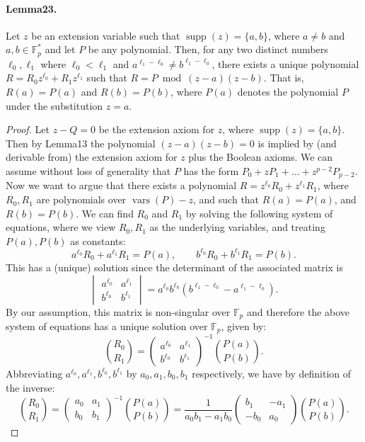 \documentclass[10pt,a4paper]{article}
\DeclareMathOperator{\supp}{supp}
\DeclareMathOperator{\vars}{vars}
\begin{document}
\paragraph{Lemma23.} Let $z$ be an extension variable such that $\supp(z)=\{a,b\}$, where $a\neq b$ and $a,b\in\mathbb F_p^*$ and let $P$ be any polynomial. Then, for any two distinct numbers $\ell_0,\ell_1$ where $\ell_0<\ell_1$ and $a^{\ell_1-\ell_0}\neq b^{\ell_1-\ell_0}$, there exists a unique polynomial $R=R_0z^{\ell_0}+R_1z^{\ell_1}$ such that $R=P\bmod(z-a)(z-b)$. That is, $R(a)=P(a)$ and $R(b)=P(b)$, where $P(a)$ denotes the polynomial $P$ under the substitution $z=a$.
\begin{proof}
Let $z-Q=0$ be the extension axiom for $z$, where $\supp(z)=\{a,b\}$. Then by Lemma13 the polynomial $(z-a)(z-b)=0$ is implied by (and derivable from) the extension axiom for $z$ plus the Boolean axioms. We can assume without loss of generality that $P$ has the form $P_0+zP_1+\ldots+z^{p-2}P_{p-2}$.
Now we want to argue that there exists a polynomial $R=z^{\ell_0}R_0+z^{\ell_1}R_1$, where $R_0,R_1$ are polynomials over $\vars(P)-z$, and such that $R(a)=P(a)$, and $R(b)=P(b)$. We can find $R_0$ and $R_1$ by solving the following system of equations, where we view $R_0,R_1$ as the underlying variables, and treating $P(a),P(b)$ as constants:
\[a^{\ell_0}R_0+a^{\ell_1}R_1=P(a),\qquad b^{\ell_0}R_0+b^{\ell_1}R_1=P(b).\]
This has a (unique) solution since the determinant of the associated matrix is
\[\begin{vmatrix}a^{\ell_0}&a^{\ell_1}\\b^{\ell_0}&b^{\ell_1}\end{vmatrix}=a^{\ell_0}b^{\ell_0}(b^{\ell_1-\ell_0}-a^{\ell_1-\ell_0}).\]
By our assumption, this matrix is non-singular over $\mathbb F_p$ and therefore the above system of equations has a unique solution over $\mathbb F_p$, given by:
\[\binom{R_0}{R_1}=\begin{pmatrix}a^{\ell_0}&a^{\ell_1}\\b^{\ell_0}&b^{\ell_1}\end{pmatrix}^{-1}\binom{P(a)}{P(b)}.\]
Abbreviating $a^{\ell_0},a^{\ell_1},b^{\ell_0},b^{\ell_1}$ by $a_0,a_1,b_0,b_1$ respectively, we have by definition of the inverse:
\[\binom{R_0}{R_1}=\begin{pmatrix}a_0&a_1\\b_0&b_1\end{pmatrix}^{-1}\binom{P(a)}{P(b)}=\frac{1}{a_0b_1-a_1b_0}\begin{pmatrix}b_1&-a_1\\-b_0&a_0\end{pmatrix}\binom{P(a)}{P(b)}.\]

\end{proof}
\end{document}
